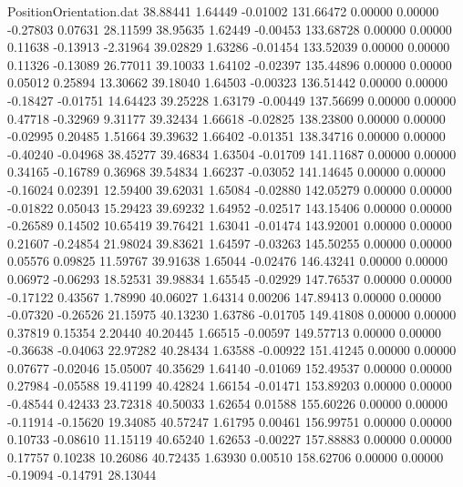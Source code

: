 \begin{filecontents}{PositionOrientation.dat}
  38.88441    1.64449   -0.01002   131.66472    0.00000    0.00000   -0.27803    0.07631   28.11599
  38.95635    1.62449   -0.00453   133.68728    0.00000    0.00000    0.11638   -0.13913   -2.31964
  39.02829    1.63286   -0.01454   133.52039    0.00000    0.00000    0.11326   -0.13089   26.77011
  39.10033    1.64102   -0.02397   135.44896    0.00000    0.00000    0.05012    0.25894   13.30662
  39.18040    1.64503   -0.00323   136.51442    0.00000    0.00000   -0.18427   -0.01751   14.64423
  39.25228    1.63179   -0.00449   137.56699    0.00000    0.00000    0.47718   -0.32969    9.31177
  39.32434    1.66618   -0.02825   138.23800    0.00000    0.00000   -0.02995    0.20485    1.51664
  39.39632    1.66402   -0.01351   138.34716    0.00000    0.00000   -0.40240   -0.04968   38.45277
  39.46834    1.63504   -0.01709   141.11687    0.00000    0.00000    0.34165   -0.16789    0.36968
  39.54834    1.66237   -0.03052   141.14645    0.00000    0.00000   -0.16024    0.02391   12.59400
  39.62031    1.65084   -0.02880   142.05279    0.00000    0.00000   -0.01822    0.05043   15.29423
  39.69232    1.64952   -0.02517   143.15406    0.00000    0.00000   -0.26589    0.14502   10.65419
  39.76421    1.63041   -0.01474   143.92001    0.00000    0.00000    0.21607   -0.24854   21.98024
  39.83621    1.64597   -0.03263   145.50255    0.00000    0.00000    0.05576    0.09825   11.59767
  39.91638    1.65044   -0.02476   146.43241    0.00000    0.00000    0.06972   -0.06293   18.52531
  39.98834    1.65545   -0.02929   147.76537    0.00000    0.00000   -0.17122    0.43567    1.78990
  40.06027    1.64314    0.00206   147.89413    0.00000    0.00000   -0.07320   -0.26526   21.15975
  40.13230    1.63786   -0.01705   149.41808    0.00000    0.00000    0.37819    0.15354    2.20440
  40.20445    1.66515   -0.00597   149.57713    0.00000    0.00000   -0.36638   -0.04063   22.97282
  40.28434    1.63588   -0.00922   151.41245    0.00000    0.00000    0.07677   -0.02046   15.05007
  40.35629    1.64140   -0.01069   152.49537    0.00000    0.00000    0.27984   -0.05588   19.41199
  40.42824    1.66154   -0.01471   153.89203    0.00000    0.00000   -0.48544    0.42433   23.72318
  40.50033    1.62654    0.01588   155.60226    0.00000    0.00000   -0.11914   -0.15620   19.34085
  40.57247    1.61795    0.00461   156.99751    0.00000    0.00000    0.10733   -0.08610   11.15119
  40.65240    1.62653   -0.00227   157.88883    0.00000    0.00000    0.17757    0.10238   10.26086
  40.72435    1.63930    0.00510   158.62706    0.00000    0.00000   -0.19094   -0.14791   28.13044

\end{filecontents}
